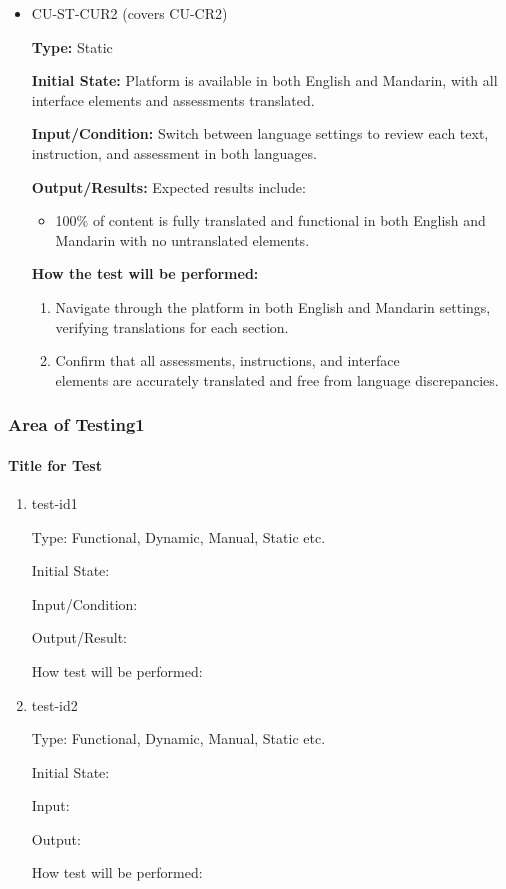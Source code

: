 \documentclass[12pt, titlepage]{article}
\begin{document}
\begin{itemize}
  \item CU-ST-CUR2 (covers CU-CR2)
  \begin{mdframed}[linewidth=0.5mm] 
    \textbf{Type:} Static \par 
    \textbf{Initial State:} Platform is available in both English and Mandarin, with all interface elements and assessments translated. \par 
    \textbf{Input/Condition:} Switch between language settings to review each text, instruction, and assessment in both languages. \par 
    \textbf{Output/Results:} Expected results include: 
    \begin{itemize} 
      \item 100\% of content is fully translated and functional in both English and Mandarin with no untranslated elements. 
    \end{itemize} \par 
    \textbf{How the test will be performed:} 
    \begin{enumerate}[noitemsep] 
      \item Navigate through the platform in both English and Mandarin settings, verifying translations for each section. 
      \item Confirm that all assessments, instructions, and interface \\elements are accurately translated and free from language discrepancies. 
    \end{enumerate} 
  \end{mdframed} 
\end{itemize}



\subsubsection{Area of Testing1}
		
\paragraph{Title for Test}

\begin{enumerate}

\item{test-id1\\}

Type: Functional, Dynamic, Manual, Static etc.
					
Initial State: 
					
Input/Condition: 
					
Output/Result: 
					
How test will be performed: 
					
\item{test-id2\\}

Type: Functional, Dynamic, Manual, Static etc.
					
Initial State: 
					
Input: 
					
Output: 
					
How test will be performed: 

\end{enumerate}
\end{document}
